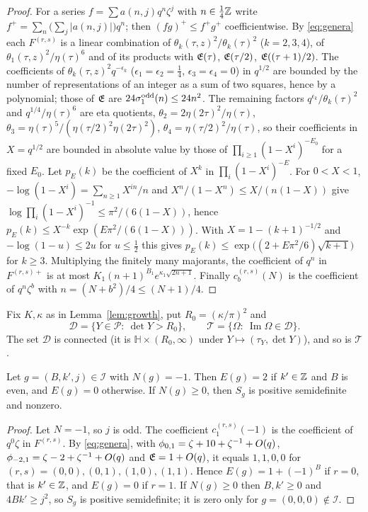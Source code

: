 \begin{proof}
For a series $f=\sum a(n,j)q^n\zeta^j$ with $n\in\frac14\mathbb{Z}$ write $f^+=\sum_n\big(\sum_j|a(n,j)|\big)q^n$; then $(fg)^+\le f^+g^+$ coefficientwise. By \eqref{eq:genera} each $F^{(r,s)}$ is a linear combination of $\theta_k(\tau,z)^2/\theta_k(\tau)^2$ ($k=2,3,4$), of $\theta_1(\tau,z)^2/\eta(\tau)^6$ and of its products with $\mathfrak E(\tau)$, $\mathfrak E(\tau/2)$, $\mathfrak E((\tau+1)/2)$. The coefficients of $\theta_k(\tau,z)^2q^{-\epsilon_k}$ ($\epsilon_1=\epsilon_2=\frac14$, $\epsilon_3=\epsilon_4=0$) in $q^{1/2}$ are bounded by the number of representations of an integer as a sum of two squares, hence by a polynomial; those of $\mathfrak E$ are $24\sigma_1^{\rm odd}(n)\le24n^2$. The remaining factors $q^{\epsilon_k}/\theta_k(\tau)^2$ and $q^{1/4}/\eta(\tau)^6$ are eta quotients, $\theta_2=2\eta(2\tau)^2/\eta(\tau)$, $\theta_3=\eta(\tau)^5/(\eta(\tau/2)^2\eta(2\tau)^2)$, $\theta_4=\eta(\tau/2)^2/\eta(\tau)$, so their coefficients in $X=q^{1/2}$ are bounded in absolute value by those of $\prod_{i\ge1}(1-X^i)^{-E_0}$ for a fixed $E_0$. Let $p_E(k)$ be the coefficient of $X^k$ in $\prod_i(1-X^i)^{-E}$. For $0<X<1$, $-\log(1-X^i)=\sum_{n\ge1}X^{in}/n$ and $X^n/(1-X^n)\le X/(n(1-X))$ give $\log\prod_i(1-X^i)^{-1}\le\pi^2/(6(1-X))$, hence $p_E(k)\le X^{-k}\exp(E\pi^2/(6(1-X)))$. With $X=1-(k+1)^{-1/2}$ and $-\log(1-u)\le2u$ for $u\le\frac12$ this gives $p_E(k)\le\exp\big((2+E\pi^2/6)\sqrt{k+1}\big)$ for $k\ge3$. Multiplying the finitely many majorants, the coefficient of $q^n$ in $F^{(r,s)+}$ is at most $K_1(n+1)^{B_1}e^{\kappa_1\sqrt{2n+1}}$. Finally $c^{(r,s)}_b(N)$ is the coefficient of $q^n\zeta^b$ with $n=(N+b^2)/4\le(N+1)/4$.
\end{proof}

Fix $K,\kappa$ as in Lemma~\ref{lem:growth}, put $R_0=(\kappa/\pi)^2$ and
\[
\mathcal D=\{Y\in\mathcal P:\ \det Y>R_0\},\qquad \mathcal T=\{\Omega:\ \operatorname{Im}\Omega\in\mathcal D\}.
\]
The set $\mathcal D$ is connected (it is $\mathbb H\times(R_0,\infty)$ under $Y\mapsto(\tau_Y,\det Y)$), and so is $\mathcal T$.

\begin{lemma}\label{lem:Nm1}
Let $g=(B,k',j)\in\mathcal I$ with $N(g)=-1$. Then $E(g)=2$ if $k'\in\mathbb{Z}$ and $B$ is even, and $E(g)=0$ otherwise. If $N(g)\ge0$, then $S_g$ is positive semidefinite and nonzero.
\end{lemma}

\begin{proof}
Let $N=-1$, so $j$ is odd. The coefficient $c^{(r,s)}_1(-1)$ is the coefficient of $q^0\zeta$ in $F^{(r,s)}$. By \eqref{eq:genera}, with $\phi_{0,1}=\zeta+10+\zeta^{-1}+O(q)$, $\phi_{-2,1}=\zeta-2+\zeta^{-1}+O(q)$ and $\mathfrak E=1+O(q)$, it equals $1,1,0,0$ for $(r,s)=(0,0),(0,1),(1,0),(1,1)$. Hence $E(g)=1+(-1)^B$ if $r=0$, that is $k'\in\mathbb{Z}$, and $E(g)=0$ if $r=1$. If $N(g)\ge0$ then $B,k'\ge0$ and $4Bk'\ge j^2$, so $S_g$ is positive semidefinite; it is zero only for $g=(0,0,0)\notin\mathcal I$.
\end{proof}

